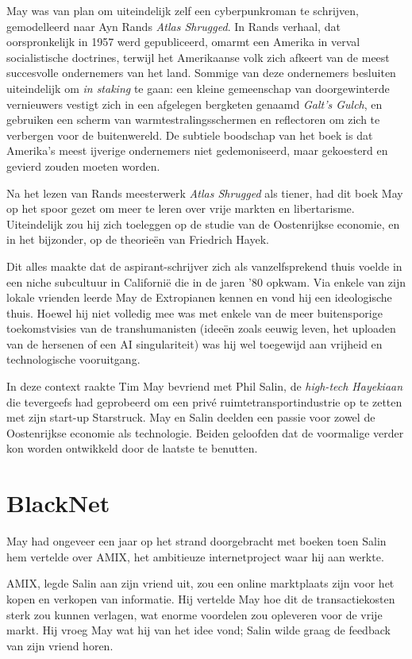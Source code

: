 \documentclass[
  a5paper,
  smalldemyvopaper,11pt,twoside,onecolumn,openright,extrafontsizes,
hidelinks]{memoir}
\begin{document}
May was van plan om uiteindelijk zelf een cyberpunkroman te schrijven,
gemodelleerd naar Ayn Rands \emph{Atlas Shrugged}. In Rands verhaal, dat
oorspronkelijk in 1957 werd gepubliceerd, omarmt een Amerika in verval
socialistische doctrines, terwijl het Amerikaanse volk zich afkeert van
de meest succesvolle ondernemers van het land. Sommige van deze
ondernemers besluiten uiteindelijk om \emph{in staking} te gaan: een
kleine gemeenschap van doorgewinterde vernieuwers vestigt zich in een
afgelegen bergketen genaamd \emph{Galt's Gulch}, en gebruiken een scherm
van warmtestralingsschermen en reflectoren om zich te verbergen voor de
buitenwereld. De subtiele boodschap van het boek is dat Amerika's meest
ijverige ondernemers niet gedemoniseerd, maar gekoesterd en gevierd
zouden moeten worden.

Na het lezen van Rands meesterwerk \emph{Atlas Shrugged} als tiener, had
dit boek May op het spoor gezet om meer te leren over vrije markten en
libertarisme. Uiteindelijk zou hij zich toeleggen op de studie van de
Oostenrijkse economie, en in het bijzonder, op de theorieën van
Friedrich Hayek.

Dit alles maakte dat de aspirant-schrijver zich als vanzelfsprekend
thuis voelde in een niche subcultuur in Californië die in de jaren '80
opkwam. Via enkele van zijn lokale vrienden leerde May de Extropianen
kennen en vond hij een ideologische thuis. Hoewel hij niet volledig mee
was met enkele van de meer buitensporige toekomstvisies van de
transhumanisten (ideeën zoals eeuwig leven, het uploaden van de hersenen
of een AI singulariteit) was hij wel toegewijd aan vrijheid en
technologische vooruitgang.

In deze context raakte Tim May bevriend met Phil Salin, de
\emph{high-tech Hayekiaan} die tevergeefs had geprobeerd om een privé
ruimtetransportindustrie op te zetten met zijn start-up Starstruck. May
en Salin deelden een passie voor zowel de Oostenrijkse economie als
technologie. Beiden geloofden dat de voormalige verder kon worden
ontwikkeld door de laatste te benutten.

\section{BlackNet}\label{blacknet}

May had ongeveer een jaar op het strand doorgebracht met boeken toen
Salin hem vertelde over AMIX, het ambitieuze internetproject waar hij
aan werkte.

AMIX, legde Salin aan zijn vriend uit, zou een online marktplaats zijn
voor het kopen en verkopen van informatie. Hij vertelde May hoe dit de
transactiekosten sterk zou kunnen verlagen, wat enorme voordelen zou
opleveren voor de vrije markt. Hij vroeg May wat hij van het idee vond;
Salin wilde graag de feedback van zijn vriend horen.
\end{document}
